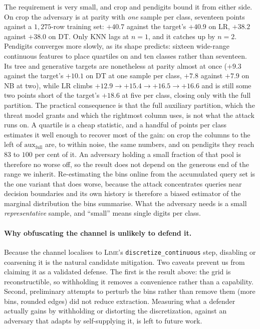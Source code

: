 \documentclass[sigconf,anonymous,review]{acmart}
\begin{document}
The requirement is very small, and crop and pendigits bound it from either side. On crop the adversary
is at parity with \emph{one} sample per class, seventeen points against a $1{,}275$-row training set:
$+40.7$ against the target's $+40.9$ on LR, $+38.2$ against $+38.0$ on DT. Only KNN lags at $n{=}1$,
and it catches up by $n{=}2$. Pendigits converges more slowly, as its shape predicts: sixteen
wide-range continuous features to place quartiles on and ten classes rather than seventeen. Its tree
and generative targets are nonetheless at parity almost at once ($+9.3$ against the target's $+10.1$
on DT at one sample per class, $+7.8$ against $+7.9$ on NB at two), while LR climbs
$+12.9 \to +15.4 \to +16.5 \to +16.6$ and is still some two points short of the target's $+18.6$ at
five per class, closing only with the full partition.
The practical consequence is that the full auxiliary partition, which the threat model grants and
which the rightmost column uses, is not what the attack runs on. A quartile is a cheap statistic, and
a handful of points per class estimates it well enough to recover most of the gain: on crop the
columns to the left of $\text{aux}_{\text{full}}$ are, to within noise, the same numbers, and on
pendigits they reach $83$ to $100$ per cent of it.
An adversary holding a small fraction of that pool is therefore no worse off, so the result does not
depend on the generous end of the range we inherit. Re-estimating the bins online from the accumulated
query set is the one variant that does worse, because the attack concentrates queries near decision
boundaries and its own history is therefore a biased estimator of the marginal distribution the bins
summarise. What the adversary needs is a small \emph{representative} sample, and ``small'' means
single digits per class.



\paragraph{Why obfuscating the channel is unlikely to defend it.} Because the channel localises to \textsc{Lime}'s
\texttt{discretize\_continuous} step, disabling or coarsening it is the natural candidate mitigation.
Two caveats prevent us from claiming it as a validated defense. The first is the result above: the
grid is reconstructible, so withholding it removes a convenience rather than a capability. Second,
preliminary attempts to perturb the bins rather than remove them (more bins, rounded edges) did not
reduce extraction. Measuring what a defender actually gains by withholding or distorting the
discretization, against an adversary that adapts by self-supplying it, is left to future work.
\end{document}
